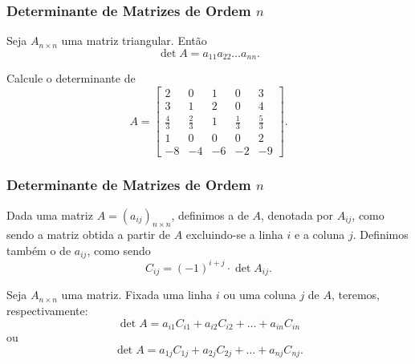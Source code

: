 
\begin{frame}
    \frametitle{Determinante de Matrizes de Ordem $n$}

    
    \begin{proposicao}\label{det-mat-triang}
        Seja $A_{n \times n}$ uma matriz triangular. Então
        $$ \det A = a_{11} a_{22} \dots a_{nn}.$$
    \end{proposicao}\pause

    \begin{exemplo}
        Calcule o determinante de 
        \begin{displaymath} A = 
            \begin{bmatrix}
                2 & 0 & 1 & 0 & 3 \\
                3 & 1 & 2 & 0 & 4 \\
                \frac 4 3 & \frac 2 3 & 1 & \frac 1 3 & \frac 5 3 \\
                1 & 0 & 0 & 0 & 2 \\
                -8 & -4 & -6 & -2 & -9 
            \end{bmatrix}.
        \end{displaymath}
    \end{exemplo}


\end{frame}


\begin{frame}
    \frametitle{Determinante de Matrizes de Ordem $n$}

    \begin{definicao}
        Dada uma matriz $A = (a_{ij})_{n \times n}$, definimos a  de $A$, denotada por $A_{ij}$, como sendo a matriz obtida a partir de $A$ excluindo-se a linha $i$ e a coluna $j$. Definimos também o  de $a_{ij}$, como sendo 
        $$ C_{ij} = (-1)^{i+j} \cdot \det A_{ij}. $$
    \end{definicao}\pause

    
    \begin{proposicao}
        Seja $A_{n \times n}$ uma matriz. Fixada uma linha $i$ ou uma coluna $j$ de $A$, teremos, respectivamente:
        $$\det A = a_{i1}C_{i1} + a_{i2}C_{i2} + \dots + a_{in}C_{in}$$
        ou
        $$\det A = a_{1j}C_{1j} + a_{2j}C_{2j} + \dots + a_{nj}C_{nj}.$$
    \end{proposicao}
\end{frame}


